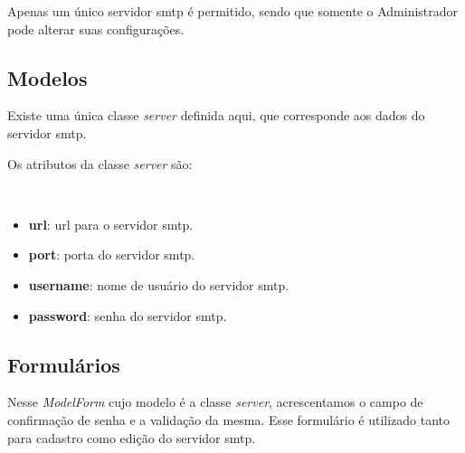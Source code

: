 \documentclass[letterpaper,10pt,brazil]{sphinxmanual}
\begin{document}
Apenas um único servidor smtp é permitido, sendo que somente o Administrador pode alterar suas configurações.


\subsection{Modelos}
\label{apps/smtp:module-smtp.server}\label{apps/smtp:modelos}
Existe uma única classe \emph{server} definida aqui, que corresponde aos dados do servidor smtp.

Os atributos da classe \emph{server} são:

\begin{fulllineitems}
\label{apps/smtp:smtp.server.server}~\begin{itemize}
\item {} 
\textbf{url}: url para o servidor smtp.

\item {} 
\textbf{port}: porta do servidor smtp.

\item {} 
\textbf{username}: nome de usuário do servidor smtp.

\item {} 
\textbf{password}: senha do servidor smtp.

\end{itemize}

\end{fulllineitems}



\subsection{Formulários}
\label{apps/smtp:module-smtp.forms}\label{apps/smtp:formularios}

\begin{fulllineitems}
\label{apps/smtp:smtp.forms.smtpform}
Nesse \emph{ModelForm} cujo modelo é a classe \emph{server}, acrescentamos o campo de confirmação de senha e a validação da mesma. Esse formulário é utilizado tanto para cadastro como edição do servidor smtp.

\end{fulllineitems}
\end{document}
